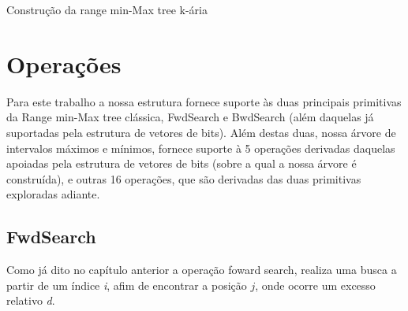 \begin{algorithm}[h!]
{{        } 
    }
    \caption{Construção da range min-Max tree k-ária}
    \label{alg:build-kary-rmm-tree}
\end{algorithm} 

\section{Operações}\label{sec:optimized-operation}
Para este trabalho a nossa estrutura fornece suporte às duas principais primitivas da Range min-Max tree clássica,
FwdSearch e BwdSearch (além daquelas já suportadas pela estrutura de vetores de bits).
Além destas duas, nossa árvore de intervalos máximos e mínimos, fornece suporte à 5 operações derivadas daquelas apoiadas pela estrutura de vetores
de bits (sobre a qual a nossa árvore é construída), e outras 16 operações, que são derivadas das duas primitivas exploradas adiante.


\subsection{FwdSearch}\label{sec:fwdSearch}
Como já dito no capítulo anterior a operação foward search, realiza uma busca a partir de um índice \textit{i}, afim de encontrar a posição $j$, onde ocorre um excesso relativo \textit{d}.


